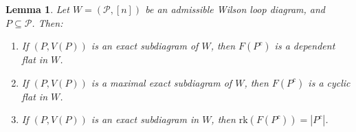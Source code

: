 \documentclass[11pt]{article}
\newcommand{\rk}{\textrm{rk} }
\newcommand{\cP}{\mathcal{P}}
\newcommand{\Prop}{\textrm{Prop}}
\newtheorem{lem}[thm]{Lemma}
\theoremstyle{remark}
\theoremstyle{definition}
\newtheorem{dfn}[thm]{Definition}
\begin{document}





\begin{lem} \label{maxexactcomplementrank}
Let $W = (\cP, [n])$ be an admissible Wilson loop diagram, and $P \subseteq \cP$. Then: \begin{enumerate}
\item If $(P,V(P))$ is an exact subdiagram of $W$, then $F(P^c)$ is a dependent flat in $W$.
\item If $(P,V(P))$ is a maximal exact subdiagram of $W$, then $F(P^c)$ is a cyclic flat in $W$.
\item If $(P,V(P))$ is an exact subdiagram in $W$, then $\rk(F(P^c)) = |P^c|$.
\end{enumerate} 
\end{lem}
\end{document}
